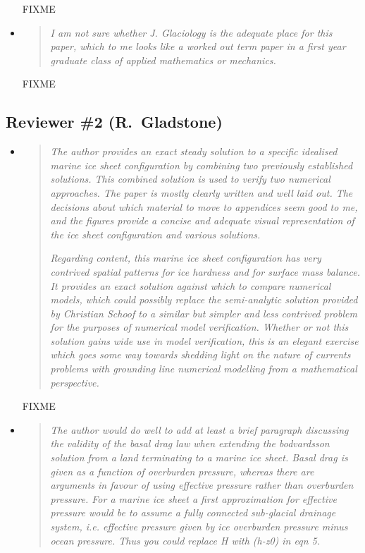\documentclass[11pt,reqno]{amsart}
\begin{document}
\begin{itemize}
\noindent FIXME

\item  \begin{quote}
\emph{I am not sure whether J. Glaciology is the adequate place for this paper, which to me looks like a worked out term paper in a first year graduate class of applied mathematics or mechanics.}
\end{quote}

\noindent FIXME
\end{itemize}





\subsection*{Reviewer \#2 (R.~Gladstone)}  \begin{itemize}
\item  \begin{quote}
\emph{The author provides an exact steady solution to a specific idealised marine ice sheet configuration by combining two previously established solutions. This combined solution is used to verify two numerical approaches. The paper is mostly clearly written and well laid out. The decisions about which material to move to appendices seem good to me, and the figures provide a concise and adequate visual representation of the ice sheet configuration and various solutions.}

\medskip
\emph{Regarding content, this marine ice sheet configuration has very contrived spatial patterns for ice hardness and for surface mass balance.  It provides an exact solution against which to compare numerical models, which could possibly replace the semi-analytic solution provided by Christian Schoof to a similar but simpler and less contrived problem for the purposes of numerical model verification. Whether or not this solution gains wide use in model verification, this is an elegant exercise which goes some way towards shedding light on the nature of currents problems with grounding line numerical modelling from a mathematical perspective.}
\end{quote}

\noindent FIXME


\item  \begin{quote}
\emph{The author would do well to add at least a brief paragraph discussing the validity of the basal drag law when extending the bodvardsson solution from a land terminating to a marine ice sheet. Basal drag is given as a function of overburden pressure, whereas there are arguments in favour of using effective pressure rather than overburden pressure. For a marine ice sheet a first approximation for effective pressure would be to assume a fully connected sub-glacial drainage system, i.e. effective pressure given by ice overburden pressure minus ocean pressure. Thus you could replace H with (h-z0) in eqn 5.}
\end{quote}


\end{itemize}
\end{document}
